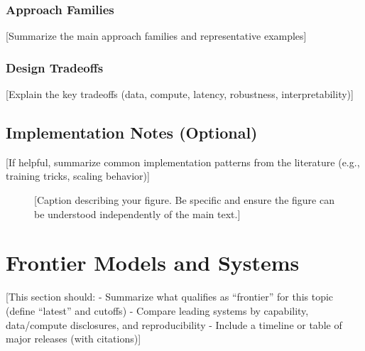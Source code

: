 \documentclass[conference]{IEEEtran}
\begin{document}
\subsubsection{Approach Families}
[Summarize the main approach families and representative examples]

\subsubsection{Design Tradeoffs}
[Explain the key tradeoffs (data, compute, latency, robustness, interpretability)]

\subsection{Implementation Notes (Optional)}
[If helpful, summarize common implementation patterns from the literature (e.g., training tricks, scaling behavior)]

\begin{figure}[t]
    \centering
    \caption{[Caption describing your figure. Be specific and ensure the figure can be understood independently of the main text.]}
    \label{fig:example}
\end{figure}

\section{Frontier Models and Systems}
[This section should:
- Summarize what qualifies as ``frontier'' for this topic (define ``latest'' and cutoffs)
- Compare leading systems by capability, data/compute disclosures, and reproducibility
- Include a timeline or table of major releases (with citations)]
\end{document}
